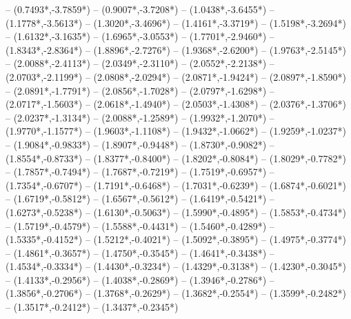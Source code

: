 {	-- ({0.7493*\dx},{-3.7859*\dy})
	-- ({0.9007*\dx},{-3.7208*\dy})
	-- ({1.0438*\dx},{-3.6455*\dy})
	-- ({1.1778*\dx},{-3.5613*\dy})
	-- ({1.3020*\dx},{-3.4696*\dy})
	-- ({1.4161*\dx},{-3.3719*\dy})
	-- ({1.5198*\dx},{-3.2694*\dy})
	-- ({1.6132*\dx},{-3.1635*\dy})
	-- ({1.6965*\dx},{-3.0553*\dy})
	-- ({1.7701*\dx},{-2.9460*\dy})
	-- ({1.8343*\dx},{-2.8364*\dy})
	-- ({1.8896*\dx},{-2.7276*\dy})
	-- ({1.9368*\dx},{-2.6200*\dy})
	-- ({1.9763*\dx},{-2.5145*\dy})
	-- ({2.0088*\dx},{-2.4113*\dy})
	-- ({2.0349*\dx},{-2.3110*\dy})
	-- ({2.0552*\dx},{-2.2138*\dy})
	-- ({2.0703*\dx},{-2.1199*\dy})
	-- ({2.0808*\dx},{-2.0294*\dy})
	-- ({2.0871*\dx},{-1.9424*\dy})
	-- ({2.0897*\dx},{-1.8590*\dy})
	-- ({2.0891*\dx},{-1.7791*\dy})
	-- ({2.0856*\dx},{-1.7028*\dy})
	-- ({2.0797*\dx},{-1.6298*\dy})
	-- ({2.0717*\dx},{-1.5603*\dy})
	-- ({2.0618*\dx},{-1.4940*\dy})
	-- ({2.0503*\dx},{-1.4308*\dy})
	-- ({2.0376*\dx},{-1.3706*\dy})
	-- ({2.0237*\dx},{-1.3134*\dy})
	-- ({2.0088*\dx},{-1.2589*\dy})
	-- ({1.9932*\dx},{-1.2070*\dy})
	-- ({1.9770*\dx},{-1.1577*\dy})
	-- ({1.9603*\dx},{-1.1108*\dy})
	-- ({1.9432*\dx},{-1.0662*\dy})
	-- ({1.9259*\dx},{-1.0237*\dy})
	-- ({1.9084*\dx},{-0.9833*\dy})
	-- ({1.8907*\dx},{-0.9448*\dy})
	-- ({1.8730*\dx},{-0.9082*\dy})
	-- ({1.8554*\dx},{-0.8733*\dy})
	-- ({1.8377*\dx},{-0.8400*\dy})
	-- ({1.8202*\dx},{-0.8084*\dy})
	-- ({1.8029*\dx},{-0.7782*\dy})
	-- ({1.7857*\dx},{-0.7494*\dy})
	-- ({1.7687*\dx},{-0.7219*\dy})
	-- ({1.7519*\dx},{-0.6957*\dy})
	-- ({1.7354*\dx},{-0.6707*\dy})
	-- ({1.7191*\dx},{-0.6468*\dy})
	-- ({1.7031*\dx},{-0.6239*\dy})
	-- ({1.6874*\dx},{-0.6021*\dy})
	-- ({1.6719*\dx},{-0.5812*\dy})
	-- ({1.6567*\dx},{-0.5612*\dy})
	-- ({1.6419*\dx},{-0.5421*\dy})
	-- ({1.6273*\dx},{-0.5238*\dy})
	-- ({1.6130*\dx},{-0.5063*\dy})
	-- ({1.5990*\dx},{-0.4895*\dy})
	-- ({1.5853*\dx},{-0.4734*\dy})
	-- ({1.5719*\dx},{-0.4579*\dy})
	-- ({1.5588*\dx},{-0.4431*\dy})
	-- ({1.5460*\dx},{-0.4289*\dy})
	-- ({1.5335*\dx},{-0.4152*\dy})
	-- ({1.5212*\dx},{-0.4021*\dy})
	-- ({1.5092*\dx},{-0.3895*\dy})
	-- ({1.4975*\dx},{-0.3774*\dy})
	-- ({1.4861*\dx},{-0.3657*\dy})
	-- ({1.4750*\dx},{-0.3545*\dy})
	-- ({1.4641*\dx},{-0.3438*\dy})
	-- ({1.4534*\dx},{-0.3334*\dy})
	-- ({1.4430*\dx},{-0.3234*\dy})
	-- ({1.4329*\dx},{-0.3138*\dy})
	-- ({1.4230*\dx},{-0.3045*\dy})
	-- ({1.4133*\dx},{-0.2956*\dy})
	-- ({1.4038*\dx},{-0.2869*\dy})
	-- ({1.3946*\dx},{-0.2786*\dy})
	-- ({1.3856*\dx},{-0.2706*\dy})
	-- ({1.3768*\dx},{-0.2629*\dy})
	-- ({1.3682*\dx},{-0.2554*\dy})
	-- ({1.3599*\dx},{-0.2482*\dy})
	-- ({1.3517*\dx},{-0.2412*\dy})
	-- ({1.3437*\dx},{-0.2345*\dy})
}
